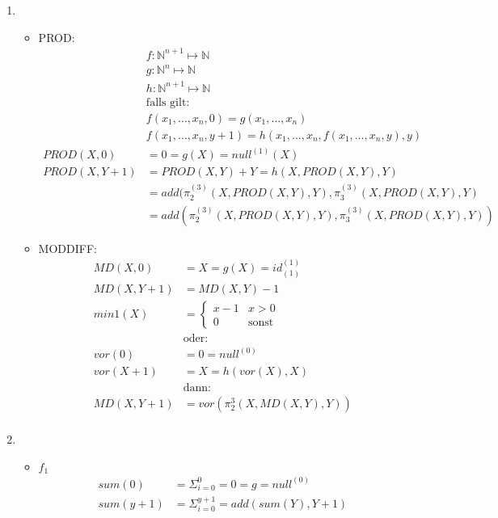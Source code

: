 \begin{enumerate}
	\item 
	\begin{itemize}
		\item PROD:
		\begin{align*}
			&f: \mathbb{N}^{n+1} \mapsto \mathbb{N} \\
			&g: \mathbb{N}^{n}\mapsto \mathbb{N}\\
			&h: \mathbb{N}^{n+1} \mapsto \mathbb{N}\\
			&\text{falls gilt:}\\
			&f(x_1, \ldots, x_n, 0) = g(x_1, \ldots, x_n)\\
			&f(x_1, \ldots, x_n, y+1) = h(x_1, \ldots, x_n, f(x_1, \ldots, x_n, y), y)\\
			PROD(X,0) &= 0 = g(X) = null^{(1)}(X)\\
			PROD(X, Y+1) &= PROD(X,Y) + Y = h(X, PROD(X,Y),Y)\\
			&= add(\pi_2^{(3)}(X,PROD(X,Y),Y),\pi_3^{(3)}(X,PROD(X,Y),Y)\\
			&= add(\pi_2^{(3)}(X,PROD(X,Y),Y),\pi_3^{(3)}(X,PROD(X,Y),Y))
		\end{align*}
		\item MODDIFF:
		\begin{align*}
	         MD(X,0) &= X = g(X) = id_{(1)}^{(1)}\\
	         MD(X,Y+1) &= MD(X,Y)-1\\
	         min1(X) &= \begin{cases} x-1 &x>0\\
	         0 &\text{sonst} \end{cases}\\
	         &\text{oder:}\\
	         vor(0) &= 0 = null^{(0)}\\
	         vor(X+1)&=X= h(vor(X), X)\\
	         &\text{dann:}\\
	         MD(X,Y+1) &= vor(\pi_2^3(X, MD(X,Y),Y))\\   
		\end{align*}
	\end{itemize}
	\item 
	\begin{itemize}
		\item $f_1$
		\begin{align*} 
		sum(0) &= \Sigma_{i=0}^{0} = 0 = g = null^{(0)} \\
	         sum(y+1) &= \Sigma_{i=0}^{y+1} = add(sum(Y), Y+1)\\

\end{align*}
\end{itemize}
\end{enumerate}
